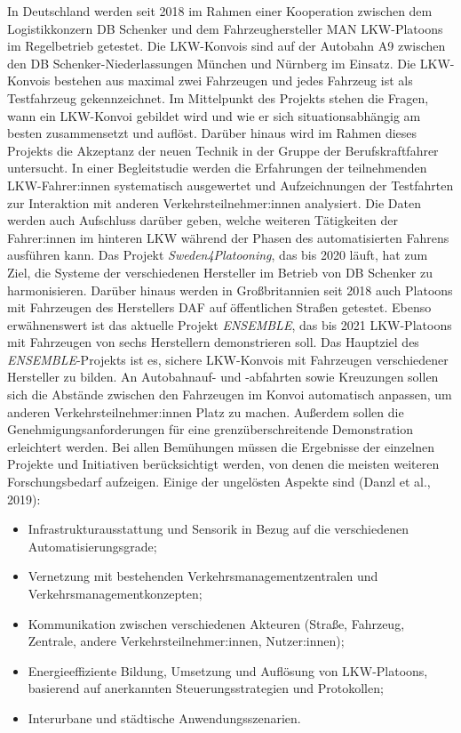 \documentclass[
]{book}
\providecommand{\tightlist}{%
  \setlength{\itemsep}{0pt}\setlength{\parskip}{0pt}}
\begin{document}
In Deutschland werden seit 2018 im Rahmen einer Kooperation zwischen dem Logistikkonzern DB Schenker und dem Fahrzeughersteller MAN LKW-Platoons im Regelbetrieb getestet. Die LKW-Konvois sind auf der Autobahn A9 zwischen den DB Schenker-Niederlassungen München und Nürnberg im Einsatz. Die LKW-Konvois bestehen aus maximal zwei Fahrzeugen und jedes Fahrzeug ist als Testfahrzeug gekennzeichnet. Im Mittelpunkt des Projekts stehen die Fragen, wann ein LKW-Konvoi gebildet wird und wie er sich situationsabhängig am besten zusammensetzt und auflöst. Darüber hinaus wird im Rahmen dieses Projekts die Akzeptanz der neuen Technik in der Gruppe der Berufskraftfahrer untersucht. In einer Begleitstudie werden die Erfahrungen der teilnehmenden LKW-Fahrer:innen systematisch ausgewertet und Aufzeichnungen der Testfahrten zur Interaktion mit anderen Verkehrsteilnehmer:innen analysiert. Die Daten werden auch Aufschluss darüber geben, welche weiteren Tätigkeiten der Fahrer:innen im hinteren LKW während der Phasen des automatisierten Fahrens ausführen kann.
Das Projekt \emph{Sweden4Platooning}, das bis 2020 läuft, hat zum Ziel, die Systeme der verschiedenen Hersteller im Betrieb von DB Schenker zu harmonisieren. Darüber hinaus werden in Großbritannien seit 2018 auch Platoons mit Fahrzeugen des Herstellers DAF auf öffentlichen Straßen getestet. Ebenso erwähnenswert ist das aktuelle Projekt \emph{ENSEMBLE}, das bis 2021 LKW-Platoons mit Fahrzeugen von sechs Herstellern demonstrieren soll. Das Hauptziel des \emph{ENSEMBLE}-Projekts ist es, sichere LKW-Konvois mit Fahrzeugen verschiedener Hersteller zu bilden. An Autobahnauf- und -abfahrten sowie Kreuzungen sollen sich die Abstände zwischen den Fahrzeugen im Konvoi automatisch anpassen, um anderen Verkehrsteilnehmer:innen Platz zu machen. Außerdem sollen die Genehmigungsanforderungen für eine grenzüberschreitende Demonstration erleichtert werden. Bei allen Bemühungen müssen die Ergebnisse der einzelnen Projekte und Initiativen berücksichtigt werden, von denen die meisten weiteren Forschungsbedarf aufzeigen. Einige der ungelösten Aspekte sind (Danzl et al., 2019):

\begin{itemize}
\tightlist
\item
  Infrastrukturausstattung und Sensorik in Bezug auf die verschiedenen Automatisierungsgrade;
\item
  Vernetzung mit bestehenden Verkehrsmanagementzentralen und Verkehrsmanagementkonzepten;
\item
  Kommunikation zwischen verschiedenen Akteuren (Straße, Fahrzeug, Zentrale, andere Verkehrsteilnehmer:innen, Nutzer:innen);
\item
  Energieeffiziente Bildung, Umsetzung und Auflösung von LKW-Platoons, basierend auf anerkannten Steuerungsstrategien und Protokollen;
\item
  Interurbane und städtische Anwendungsszenarien.
\end{itemize}
\end{document}
